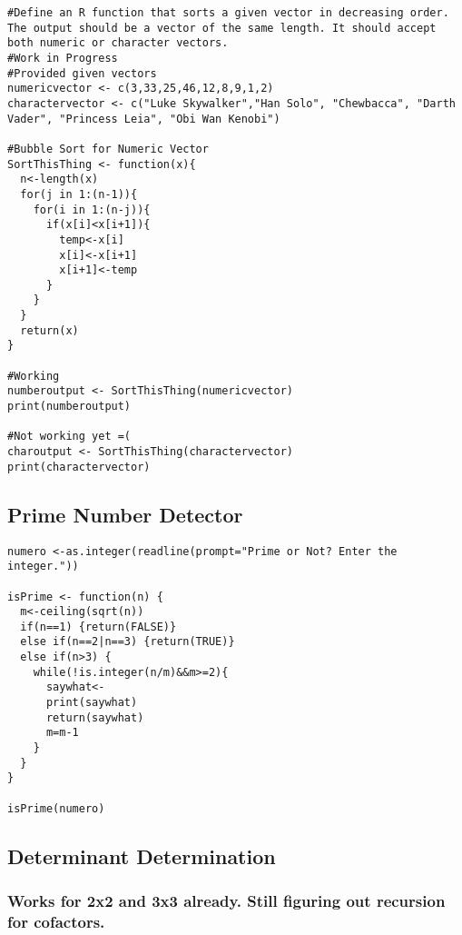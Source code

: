\documentclass[]{article}
\begin{document}
\begin{verbatim}
#Define an R function that sorts a given vector in decreasing order. The output should be a vector of the same length. It should accept both numeric or character vectors.
#Work in Progress
#Provided given vectors
numericvector <- c(3,33,25,46,12,8,9,1,2)
charactervector <- c("Luke Skywalker","Han Solo", "Chewbacca", "Darth Vader", "Princess Leia", "Obi Wan Kenobi")

#Bubble Sort for Numeric Vector
SortThisThing <- function(x){
  n<-length(x)
  for(j in 1:(n-1)){
    for(i in 1:(n-j)){
      if(x[i]<x[i+1]){
        temp<-x[i]
        x[i]<-x[i+1]
        x[i+1]<-temp
      }
    }
  }
  return(x)
}

#Working
numberoutput <- SortThisThing(numericvector)
print(numberoutput)

#Not working yet =( 
charoutput <- SortThisThing(charactervector)
print(charactervector)
\end{verbatim}

\subsection{Prime Number Detector}\label{prime-number-detector}

\begin{verbatim}
numero <-as.integer(readline(prompt="Prime or Not? Enter the integer."))

isPrime <- function(n) {
  m<-ceiling(sqrt(n))
  if(n==1) {return(FALSE)}
  else if(n==2|n==3) {return(TRUE)}
  else if(n>3) {
    while(!is.integer(n/m)&&m>=2){
      saywhat<-
      print(saywhat)
      return(saywhat)
      m=m-1
    }
  }
}

isPrime(numero)
\end{verbatim}

\subsection{Determinant Determination}\label{determinant-determination}

\subsubsection{Works for 2x2 and 3x3 already. Still figuring out
recursion for
cofactors.}\label{works-for-2x2-and-3x3-already.-still-figuring-out-recursion-for-cofactors.}
\end{document}
